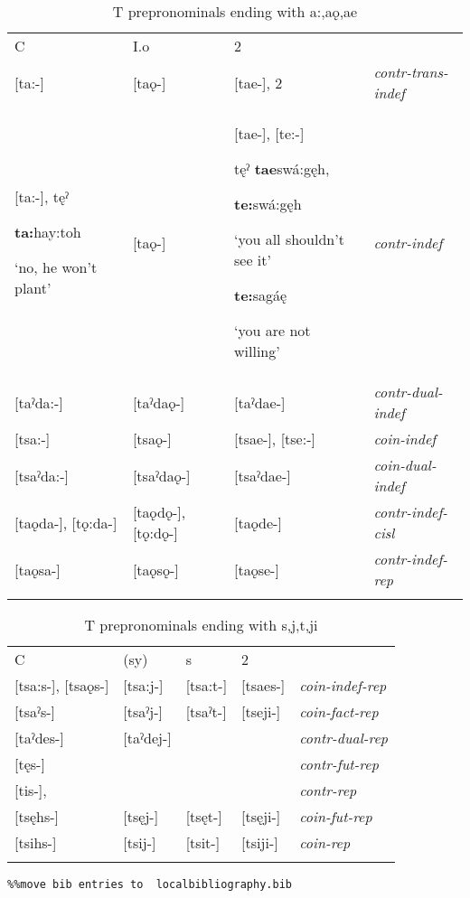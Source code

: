 
\begin{table}
\caption{T prepronominals ending with a:,aǫ,ae}
\label{tab:1:contrcoinindefcislrep}
\scriptsize{
\begin{tabularx}{\textwidth}{XXXX}
\lsptoprule
C & I.o & 2 & \\
{}[ta:-] & [taǫ-] & [tae-], 2 & {\itshape contr-trans-indef}\\
{}[ta:-], tęˀ 

\textbf{ta:}hay\’{ę}:toh 

‘no, he won’t plant’ & [taǫ-] & [tae-], [te:-] 

tęˀ \textbf{tae}swá:gęh, 

\textbf{te:}swá:gęh 

‘you all shouldn’t see it’ 

\textbf{te:}sagáę 

‘you are not willing’ & {\itshape contr-indef}\\
{}[taˀda:-] & [taˀdaǫ-] & [taˀdae-] & {\itshape contr-dual-indef}\\
{}[tsa:-] & [tsaǫ-] & [tsae-], [tse:-] & {\itshape coin-indef}\\
{}[tsaˀda:-] & [tsaˀdaǫ-] & [tsaˀdae-] & {\itshape coin-dual-indef}\\
{}[taǫda-], [tǫ:da-] & [taǫdǫ-], [tǫ:dǫ-] & [taǫde-] & {\itshape contr-indef-cisl}\\
{}[taǫsa-] & [taǫsǫ-] & [taǫse-] & {\itshape contr-indef-rep}\\
\lspbottomrule
\end{tabularx}}
\end{table}



\begin{table}
\caption{T prepronominals ending with s,j,t,ji}
\label{tab:1:coincontrotherrep}
\scriptsize{
\begin{tabularx}{\textwidth}{XXXXX}
\lsptoprule
C & (sy) & s & 2 & \\
{}[tsa:s-], [tsaǫs-] & [tsa:j-] & [tsa:t-] & [tsaes-] & {\itshape coin-indef-rep}\\
{}[tsaˀs-] & [tsaˀj-] & [tsaˀt-] & [tseji-] & {\itshape coin-fact-rep}\\
{}[taˀdes-] & [taˀdej-] &  &  & {\itshape contr-dual-rep}\\
{}[tęs-] &  &  &  & {\itshape contr-fut-rep}\\
{}[tis-], &  &  &  & {\itshape contr-rep}\\
{}[tsęhs-] & [tsęj-] & [tsęt-] & [tsęji-] & {\itshape coin-fut-rep}\\
{}[tsihs-] & [tsij-] & [tsit-] & [tsiji-] & {\itshape coin-rep}\\
\lspbottomrule
\end{tabularx}}
\end{table}

\begin{verbatim}%%move bib entries to  localbibliography.bib
\end{verbatim}
